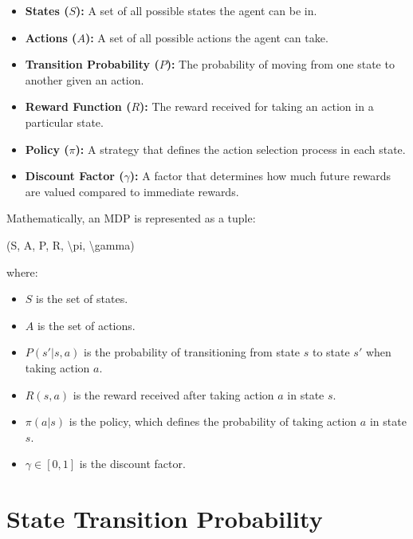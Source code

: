 \documentclass[
]{book}
\newenvironment{Shaded}{\begin{snugshade}}{\end{snugshade}}
\newcommand{\NormalTok}[1]{#1}
\providecommand{\tightlist}{%
  \setlength{\itemsep}{0pt}\setlength{\parskip}{0pt}}
\begin{document}
\begin{itemize}
\tightlist
\item
  \textbf{States (\(S\)):} A set of all possible states the agent can be in.
\item
  \textbf{Actions (\(A\)):} A set of all possible actions the agent can take.
\item
  \textbf{Transition Probability (\(P\)):} The probability of moving from one state to another given an action.
\item
  \textbf{Reward Function (\(R\)):} The reward received for taking an action in a particular state.
\item
  \textbf{Policy (\(\pi\)):} A strategy that defines the action selection process in each state.
\item
  \textbf{Discount Factor (\(\gamma\)):} A factor that determines how much future rewards are valued compared to immediate rewards.
\end{itemize}

Mathematically, an MDP is represented as a tuple:

\begin{Shaded}
\begin{Highlighting}[]
\NormalTok{(S, A, P, R, \textbackslash{}pi, \textbackslash{}gamma)}
\end{Highlighting}
\end{Shaded}

where:

\begin{itemize}
\tightlist
\item
  \(S\) is the set of states.
\item
  \(A\) is the set of actions.
\item
  \(P(s' | s, a)\) is the probability of transitioning from state \(s\) to state \(s'\) when taking action \(a\).
\item
  \(R(s, a)\) is the reward received after taking action \(a\) in state \(s\).
\item
  \(\pi(a | s)\) is the policy, which defines the probability of taking action \(a\) in state \(s\).
\item
  \(\gamma \in [0,1]\) is the discount factor.
\end{itemize}

\section{\texorpdfstring{\textbf{State Transition Probability}}{State Transition Probability}}\label{state-transition-probability}
\end{document}
